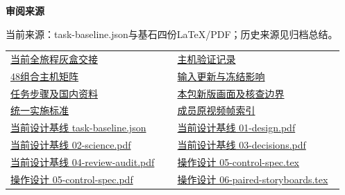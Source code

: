 \documentclass[11pt,a4paper]{article}
\newcommand{\reviewsubsection}[1]{\par\Needspace{4\baselineskip}\vspace{4pt}\begin{center}{\titlelatin\titlecjk\bfseries\fontsize{12}{18}\selectfont #1}\end{center}}
\begin{document}
\begin{minipage}{\linewidth}
\reviewsubsection{3.4 审阅来源}
当前来源：task-\allowbreak{}baseline.json与基石四份LaTeX/\allowbreak{}PDF；历史来源见归档总结。


\begingroup\small\setlength{\tabcolsep}{4pt}\begin{tabular}{@{}p{0.48\linewidth}p{0.48\linewidth}@{}}
\href{file:///D:/Agent/srp/agent/tasks/V-05/outputs/current-graybox.md}{当前全旅程灰盒交接} & \href{file:///D:/Agent/srp/agent/tasks/V-05/evidence/verification.json}{主机验证记录}\\[4pt]
\href{file:///D:/Agent/srp/agent/tasks/V-05/evidence/runtime/core-matrix.json}{48组合主机矩阵} & \href{file:///D:/Agent/srp/agent/tasks/V-05/evidence/consumer-impact.md}{输入更新与冻结影响}\\[4pt]
\href{file:///D:/Agent/srp/agent/tasks/V-05/TASK.md}{任务步骤及国内资料} & \href{file:///D:/Agent/srp/agent/tasks/V-05/outputs/current-implementation-evidence.md}{本包新版画面及核查边界}\\[4pt]
\href{file:///D:/Agent/srp/agent/design/weather/2026-10-08_Storm\%E4\%B8\%8E\%E7\%BA\%AF\%E7\%B2\%92\%E5\%AD\%90\%E5\%8F\%8C\%E7\%8E\%AF\%E5\%AE\%9E\%E6\%96\%BD\%E6\%A0\%87\%E5\%87\%86.md}{统一实施标准} & \href{file:///D:/Agent/srp/human/assets/previews/2026-10-08/member-storm-particle-rings/frame-index.json}{成员原视频帧索引}\\[4pt]
\href{file:///D:/Agent/srp/agent/design/design-foundation-20261008/task-baseline.json}{当前设计基线 task-\allowbreak{}baseline.json} & \href{file:///D:/Agent/srp/agent/design/design-foundation-20261008/01-design.pdf}{当前设计基线 01-\allowbreak{}design.pdf}\\[4pt]
\href{file:///D:/Agent/srp/agent/design/design-foundation-20261008/02-science.pdf}{当前设计基线 02-\allowbreak{}science.pdf} & \href{file:///D:/Agent/srp/agent/design/design-foundation-20261008/03-decisions.pdf}{当前设计基线 03-\allowbreak{}decisions.pdf}\\[4pt]
\href{file:///D:/Agent/srp/agent/design/design-foundation-20261008/04-review-audit.pdf}{当前设计基线 04-\allowbreak{}review-\allowbreak{}audit.pdf} & \href{file:///D:/Agent/srp/agent/design/design-foundation-20261008/05-control-spec.tex}{操作设计 05-\allowbreak{}control-\allowbreak{}spec.tex}\\[4pt]
\href{file:///D:/Agent/srp/agent/design/design-foundation-20261008/05-control-spec.pdf}{操作设计 05-\allowbreak{}control-\allowbreak{}spec.pdf} & \href{file:///D:/Agent/srp/agent/design/design-foundation-20261008/06-paired-storyboards.tex}{操作设计 06-\allowbreak{}paired-\allowbreak{}storyboards.tex}\\[4pt]

\end{tabular}
\end{minipage}
\end{document}
